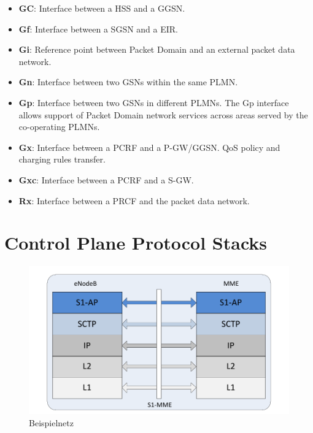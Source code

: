 \begin{itemize}
\item \textbf{GC}: Interface between a HSS and a GGSN.
\item \textbf{Gf}: Interface between a SGSN and a EIR.
\item \textbf{Gi}: Reference point between Packet Domain and an external packet data network.
\item \textbf{Gn}: Interface between two GSNs within the same PLMN.
\item \textbf{Gp}: Interface between two GSNs in different PLMNs. The Gp interface allows support of Packet Domain network services across areas served by the co-operating PLMNs.
\item \textbf{Gx}: Interface between a PCRF and a P-GW/GGSN. QoS policy and charging rules transfer.
\item \textbf{Gxc}: Interface between a PCRF and a S-GW.

\item \textbf{Rx}: Interface between a PRCF and the packet data network.
\end{itemize}

\section{Control Plane Protocol Stacks}

\begin{figure}[htbp]
	\centering
 	\includegraphics[width=1.0\textwidth]{images/3gpp/eNB-MME-layers.pdf}
 	\caption{Beispielnetz}\label{fig:3gpp-enbmme}
\end{figure}

